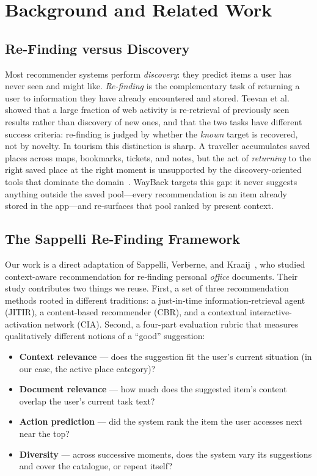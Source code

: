 \documentclass[acmlarge]{acmart}
\begin{document}
\section{Background and Related Work}
\label{sec:background}

\subsection{Re-Finding versus Discovery}
Most recommender systems perform \emph{discovery}: they predict items a
user has never seen and might like. \emph{Re-finding} is the complementary
task of returning a user to information they have already encountered and
stored. Teevan et al.~\cite{teevan2007reretrieval} showed that a large
fraction of web activity is re-retrieval of previously seen results rather
than discovery of new ones, and that the two tasks have different success
criteria: re-finding is judged by whether the \emph{known} target is
recovered, not by novelty. In tourism this distinction is sharp. A
traveller accumulates saved places across maps, bookmarks, tickets, and
notes, but the act of \emph{returning} to the right saved place at the
right moment is unsupported by the discovery-oriented tools that dominate
the domain~\cite{borras2014tourism}. WayBack targets this gap: it never
suggests anything outside the saved pool---every recommendation is an item
already stored in the app---and re-surfaces that pool ranked by present
context.

\subsection{The Sappelli Re-Finding Framework}
Our work is a direct adaptation of Sappelli, Verberne, and
Kraaij~\cite{sappelli2017}, who studied context-aware recommendation for
re-finding personal \emph{office} documents. Their study contributes two
things we reuse. First, a set of three recommendation methods rooted in
different traditions: a just-in-time information-retrieval agent (JITIR), a
content-based recommender (CBR), and a contextual interactive-activation
network (CIA). Second, a four-part evaluation rubric that measures
qualitatively different notions of a ``good'' suggestion:

\begin{itemize}
  \item \textbf{Context relevance} --- does the suggestion fit the user's
        current situation (in our case, the active place category)?
  \item \textbf{Document relevance} --- how much does the suggested item's
        content overlap the user's current task text?
  \item \textbf{Action prediction} --- did the system rank the item the
        user accesses next near the top?
  \item \textbf{Diversity} --- across successive moments, does the system
        vary its suggestions and cover the catalogue, or repeat itself?
\end{itemize}
\end{document}
